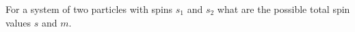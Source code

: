 

\vspace*{\fill}
\centering

For a system of two particles with spins $s_1$ and $s_2$ what are the possible total spin values $s$ and $m$.

\centering
\vspace*{\fill}

